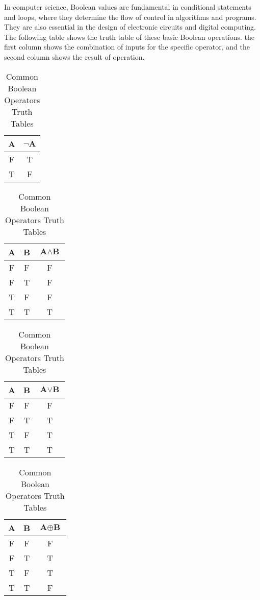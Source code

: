         In computer science, Boolean values are fundamental in conditional statements and loops, where they determine the flow of control in algorithms and programs. They are also essential in the design of electronic circuits and digital computing.
        The following table shows the truth table of these basic Boolean operations. the first column
        shows the combination of inputs for the specific operator, and the second column shows the
        result of operation.
        \begin{table}[ht] \label{truthtab}
            \centering %
            
            \noindent
            \begin{tabular}{c|c}
            \textbf{A} & $\neg \textbf{A}$ \\
            \hline
            F & T \\
            T & F \\
            \end{tabular}
            \quad %
            \begin{tabular}{cc|c}
            \textbf{A} & \textbf{B} & $\textbf{A} \land \textbf{B}$ \\
            \hline
            F & F & F \\
            F & T & F \\
            T & F & F \\
            T & T & T \\
            \end{tabular}
            
            \vspace{2mm} %
            
            \noindent
            \begin{tabular}{cc|c}
            \textbf{A} & \textbf{B} & $\textbf{A} \lor \textbf{B}$ \\
            \hline
            F & F & F \\
            F & T & T \\
            T & F & T \\
            T & T & T \\
            \end{tabular}
            \quad %
            \begin{tabular}{cc|c}
            \textbf{A} & \textbf{B} & $\textbf{A} \oplus \textbf{B}$ \\
            \hline
            F & F & F \\
            F & T & T \\
            T & F & T \\
            T & T & F \\
            \end{tabular}
            
            \caption{Common Boolean Operators Truth Tables}
        \end{table}

